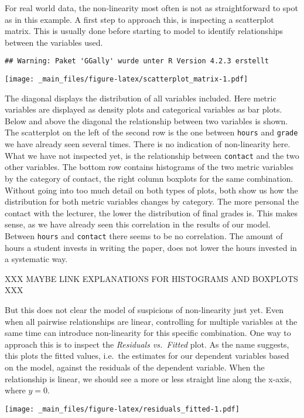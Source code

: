 \documentclass[
]{book}
\begin{document}
For real world data, the non-linearity most often is not as straightforward to
spot as in this example. A first step to approach this, is inspecting a
scatterplot matrix. This is usually done before starting to model to identify
relationships between the variables used.

\begin{verbatim}
## Warning: Paket 'GGally' wurde unter R Version 4.2.3 erstellt
\end{verbatim}

\texttt{[image: \_main\_files/figure-latex/scatterplot\_matrix-1.pdf]}

The diagonal displays the distribution of all variables included. Here metric
variables are displayed as density plots and categorical variables as bar plots.
Below and above the diagonal the relationship between two variables is shown.
The scatterplot on the left of the second row is the one between \texttt{hours} and
\texttt{grade} we have already seen several times. There is no indication of
non-linearity here. What we have not inspected yet, is the relationship
between \texttt{contact} and the two other variables.
The bottom row contains histograms of the two metric variables by the category
of contact, the right column boxplots for the same combination. Without going
into too much detail on both types of plots, both show us how the distribution
for both metric variables changes by category. The more personal the contact
with the lecturer, the lower the distribution of final grades is. This makes
sense, as we have already seen this correlation in the results of our model.
Between \texttt{hours} and \texttt{contact} there seems to be no correlation. The amount of
hours a student invests in writing the paper, does not lower the hours invested
in a systematic way.

XXX MAYBE LINK EXPLANATIONS FOR HISTOGRAMS AND BOXPLOTS XXX

But this does not clear the model of suspicions of non-linearity just yet. Even
when all pairwise relationships are linear, controlling for multiple variables
at the same time can introduce non-linearity for this specific combination.
One way to approach this is to inspect the \emph{Residuals vs.~Fitted} plot. As the
name suggests, this plots the fitted values, i.e.~the estimates for our
dependent variables based on the model, against the residuals of the dependent
variable. When the relationship is linear, we should see a more or less straight
line along the x-axis, where \(y = 0\).

\texttt{[image: \_main\_files/figure-latex/residuals\_fitted-1.pdf]}
\end{document}
